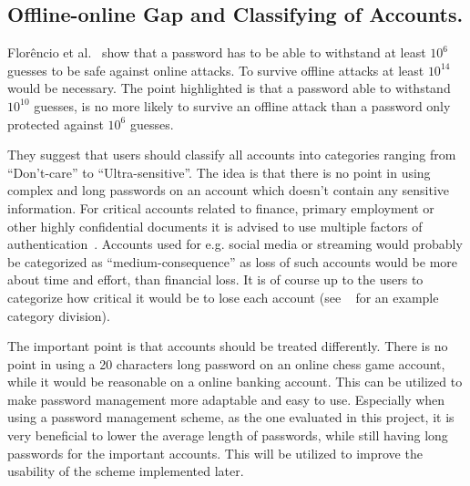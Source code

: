 \subsection{Offline-online Gap and Classifying of Accounts.}\label{classification} Florêncio et al.~\cite{guide-pws} show that a password has to be able to withstand at least $10^6$ guesses to be safe against online attacks. To survive offline attacks at least $10^{14}$ would be necessary. The point highlighted is that a password able to withstand $10^{10}$ guesses, is no more likely to survive an offline attack than a password only protected against $10^6$ guesses. 
\par They suggest that users should classify all accounts into categories ranging from ``Don't-care'' to ``Ultra-sensitive''. The idea is that there is no point in using complex and long passwords on an account which doesn't contain any sensitive information. For critical accounts related to finance, primary employment or other highly confidential documents it is advised to use multiple factors of authentication~\cite{2-factor-auth}. Accounts used for e.g. social media or streaming would probably be categorized as ``medium-consequence'' as loss of such accounts would be more about time and effort, than financial loss. It is of course up to the users to categorize how critical it would be to lose each account (see ~\cite{guide-pws} for an example category division). 
\par The important point is that accounts should be treated differently. There is no point in using a 20 characters long password on an online chess game account, while it would be reasonable on a online banking account. This can be utilized to make password management more adaptable and easy to use. Especially when using a password management scheme, as the one evaluated in this project, it is very beneficial to lower the average length of passwords, while still having long passwords for the important accounts. This will be utilized to improve the usability of the scheme implemented later.



